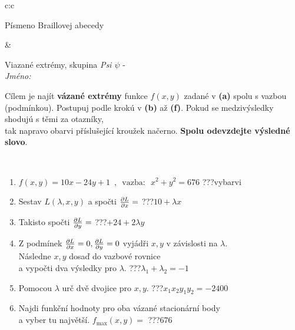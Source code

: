 \documentclass[10pt]{report}
\begin{document}
\begin{tabular}{c:c}
\begin{minipage}[c][104.5mm][t]{0.5\linewidth}
\begin{center}
\begin{minipage}{0.20\linewidth}
\begin{center}
{\small Písmeno Braillovej abecedy}
\end{center}
\end{minipage}
\end{center}
\end{minipage}
&
\begin{minipage}[c][104.5mm][t]{0.5\linewidth}
\begin{center}
\vspace{7mm}
{\huge Viazané extrémy, skupina \textit{Psi $\psi$} -}\\[5mm]
\textit{Jméno:}\phantom{xxxxxxxxxxxxxxxxxxxxxxxxxxxxxxxxxxxxxxxxxxxxxxxxxxxxxxxxxxxxxxxxx}\\[5mm]
\begin{minipage}{0.95\linewidth}
\begin{center}
Cílem je najít \textbf{vázané extrémy} funkce $f(x,y)$ zadané v \textbf{(a)} spolu s vazbou (podmínkou). Postupuj podle krokú v \textbf{(b)} až \textbf{(f)}. Pokud se medzivýsledky shodujú s těmi za otazníky,\\tak napravo obarvi příslušející kroužek načerno. \textbf{Spolu odevzdejte výsledné slovo}.
\end{center}
\end{minipage}
\\[1mm]
\begin{minipage}{0.79\linewidth}
\begin{center}
\begin{varwidth}{\linewidth}
\begin{enumerate}
\normalsize
\item $f(x,y)=10x-24y+1 \enspace , \enspace \mathrm{vazba:} \enspace x^2+y^2=676$\quad \dotfill\; ???\;\dotfill \quad vybarvi
\item Sestav $L(\lambda,x,y)$ a spočti $\pdv{L}{x}=$\quad \dotfill\; ???\;\dotfill \quad $10+\lambda x$
\item Takisto spočti $\pdv{L}{y}=$\quad \dotfill\; ???\;\dotfill \quad $+24+2\lambda y$
\item Z podmínek $\pdv{L}{x}=0 , \pdv{L}{y}=0$ vyjádři $x,y$ v závislosti na $\lambda$.\\ \phantom{xxxxxx}Následne $x,y$ dosaď do vazbové rovnice\\ \phantom{xxxxxx}a vypočti dva výsledky pro $\lambda$.\quad \dotfill\; ???\;\dotfill \quad $\lambda_1+\lambda_2=-1$
\item Pomocou $\lambda$ urč dvě dvojice pro $x,y$.\quad \dotfill\; ???\;\dotfill \quad $x_1 x_2 y_1 y_2=-2400$
\item Najdi funkční hodnoty pro oba vázané stacionární body\\ \phantom{xxxxxx}a vyber tu najvětší. $f_{\text{max}}(x,y)=$\quad \dotfill\; ???\;\dotfill \quad $676$

\end{enumerate}
\end{varwidth}
\end{center}
\end{minipage}
\end{center}
\end{minipage}
\end{tabular}
\end{document}
